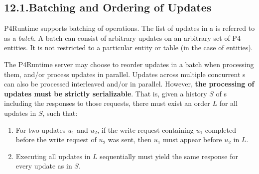 \documentclass[11pt]{article}
\begin{document}
{%
\subsection{12.1.\hspace*{0.5em}Batching and Ordering of Updates}\label{sec-batching-and-ordering-of-updates}%

\noindent{}P4Runtime supports batching of  operations. The list of updates in a
 is referred to as a \emph{batch}. A batch can consist of arbitrary
updates on an arbitrary set of P4 entities. It is not restricted to a particular
entity or table (in the case of  entities).%

The P4Runtime server may choose to reorder updates in a batch when processing
them, and/or process updates in parallel.  Updates across multiple concurrent
s can also be processed interleaved and/or in parallel.
However, \textbf{the processing of updates must be strictly serializable}.  That
is, given a history $S$ of s including the responses to those
requests, there must exist an order $L$ for all updates in $S$, such that:%

\begin{enumerate}[noitemsep,topsep=\mdcompacttopsep]%

\item{}For two updates $u_1$ and $u_2$, if the write request containing $u_1$
completed before the write request of $u_2$ was sent, then $u_1$ must appear
before $u_2$ in $L$.%

\item{}Executing all updates in $L$ sequentially must yield the same response for
every update as in $S$.%


\end{enumerate}}
\end{document}
